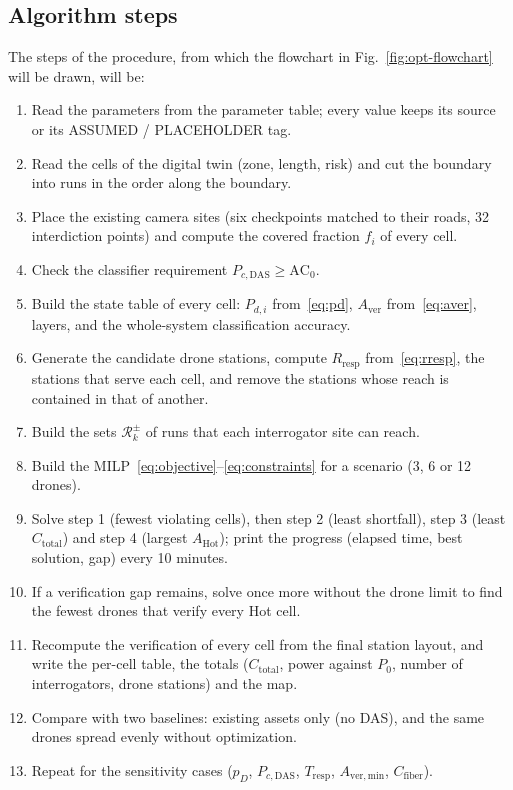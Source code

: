 \documentclass[11pt,a4paper]{article}
\newcommand{\ACzero}{\mathrm{AC}_{0}}
\newcommand{\Ctotal}{C_{\mathrm{total}}}
\newcommand{\Pzero}{P_{0}}
\begin{document}
\subsection{Algorithm steps}
\label{sec:algorithm}
The steps of the procedure, from which the flowchart in Fig.~\ref{fig:opt-flowchart} will be drawn, will be:
\begin{enumerate}
  \item Read the parameters from the parameter table; every value keeps its source or its ASSUMED / PLACEHOLDER tag.
  \item Read the cells of the digital twin (zone, length, risk) and cut the boundary into runs in the order along the boundary.
  \item Place the existing camera sites (six checkpoints matched to their roads, 32 interdiction points) and compute the covered fraction $f_i$ of every cell.
  \item Check the classifier requirement $P_{c,\mathrm{DAS}}\ge\ACzero$.
  \item Build the state table of every cell: $P_{d,i}$ from~\eqref{eq:pd}, $A_{\mathrm{ver}}$ from~\eqref{eq:aver}, layers, and the whole-system classification accuracy.
  \item Generate the candidate drone stations, compute $R_{\mathrm{resp}}$ from~\eqref{eq:rresp}, the stations that serve each cell, and remove the stations whose reach is contained in that of another.
  \item Build the sets $\mathcal{R}_k^{\pm}$ of runs that each interrogator site can reach.
  \item Build the MILP~\eqref{eq:objective}--\eqref{eq:constraints} for a scenario (3, 6 or 12 drones).
  \item Solve step 1 (fewest violating cells), then step 2 (least shortfall), step 3 (least $\Ctotal$) and step 4 (largest $A_{\mathrm{Hot}}$); print the progress (elapsed time, best solution, gap) every 10 minutes.
  \item If a verification gap remains, solve once more without the drone limit to find the fewest drones that verify every Hot cell.
  \item Recompute the verification of every cell from the final station layout, and write the per-cell table, the totals ($\Ctotal$, power against $\Pzero$, number of interrogators, drone stations) and the map.
  \item Compare with two baselines: existing assets only (no DAS), and the same drones spread evenly without optimization.
  \item Repeat for the sensitivity cases ($p_D$, $P_{c,\mathrm{DAS}}$, $T_{\mathrm{resp}}$, $A_{\mathrm{ver,min}}$, $C_{\mathrm{fiber}}$).
\end{enumerate}
\end{document}
